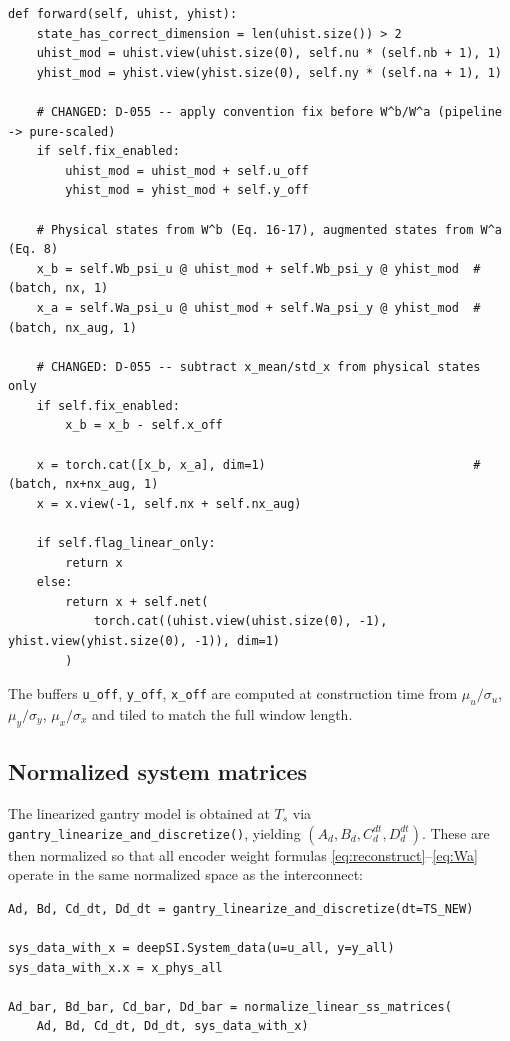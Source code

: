 \documentclass[11pt,a4paper]{article}
\newcommand{\code}[1]{\texttt{#1}}
\newcommand{\codetitle}[2]{\small\texttt{#1}\quad lines #2}
\begin{document}
\begin{lstlisting}[style=py,
  title={\codetitle{model\_augmentation/fit\_systems/pre\_encoder.py}{444--480} -- \texttt{linear\_encoder\_init\_aug.forward()}},
  firstnumber=444]
def forward(self, uhist, yhist):
    state_has_correct_dimension = len(uhist.size()) > 2
    uhist_mod = uhist.view(uhist.size(0), self.nu * (self.nb + 1), 1)
    yhist_mod = yhist.view(yhist.size(0), self.ny * (self.na + 1), 1)

    # CHANGED: D-055 -- apply convention fix before W^b/W^a (pipeline -> pure-scaled)
    if self.fix_enabled:
        uhist_mod = uhist_mod + self.u_off
        yhist_mod = yhist_mod + self.y_off

    # Physical states from W^b (Eq. 16-17), augmented states from W^a (Eq. 8)
    x_b = self.Wb_psi_u @ uhist_mod + self.Wb_psi_y @ yhist_mod  # (batch, nx, 1)
    x_a = self.Wa_psi_u @ uhist_mod + self.Wa_psi_y @ yhist_mod  # (batch, nx_aug, 1)

    # CHANGED: D-055 -- subtract x_mean/std_x from physical states only
    if self.fix_enabled:
        x_b = x_b - self.x_off

    x = torch.cat([x_b, x_a], dim=1)                             # (batch, nx+nx_aug, 1)
    x = x.view(-1, self.nx + self.nx_aug)

    if self.flag_linear_only:
        return x
    else:
        return x + self.net(
            torch.cat((uhist.view(uhist.size(0), -1), yhist.view(yhist.size(0), -1)), dim=1)
        )
\end{lstlisting}

The buffers \code{u\_off}, \code{y\_off}, \code{x\_off} are computed at
construction time from $\mu_u/\sigma_u$, $\mu_y/\sigma_y$, $\mu_x/\sigma_x$
and tiled to match the full window length.

\subsection{Normalized system matrices}

The linearized gantry model is obtained at $T_s$ via
\code{gantry\_linearize\_and\_discretize()}, yielding
$(A_d, B_d, C_d^{dt}, D_d^{dt})$.
These are then normalized so that all encoder weight formulas
\eqref{eq:reconstruct}--\eqref{eq:Wa} operate in the same normalized
space as the interconnect:

\begin{lstlisting}[style=py,
  title={\codetitle{gantry\_interconnect\_dynamic.py}{295--313}},
  firstnumber=295]
Ad, Bd, Cd_dt, Dd_dt = gantry_linearize_and_discretize(dt=TS_NEW)

sys_data_with_x = deepSI.System_data(u=u_all, y=y_all)
sys_data_with_x.x = x_phys_all

Ad_bar, Bd_bar, Cd_bar, Dd_bar = normalize_linear_ss_matrices(
    Ad, Bd, Cd_dt, Dd_dt, sys_data_with_x)
\end{lstlisting}
\end{document}
